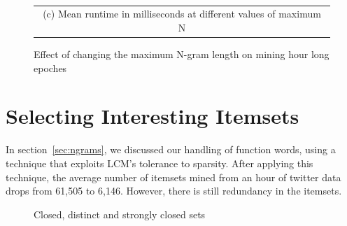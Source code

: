 \documentclass[letterpaper,12pt,titlepage,oneside,final]{book}
\begin{document}
\begin{figure}
{}
\\
\begin{tabular}{c}
\\(c) Mean runtime in milliseconds at different values of maximum N
\end{tabular}
\caption{Effect of changing the maximum N-gram length on mining hour long epoches}
\label{fig:ngramsLen}
\end{figure} 






\chapter{Selecting Interesting Itemsets}
\label{sec:strong}



In section~\ref{sec:ngrams}, we discussed our handling of function words,
using a technique that exploits LCM's tolerance to sparsity.
After applying this technique, the average number of itemsets mined from an
hour of twitter data drops from 61,505 to 6,146.
However, there is still redundancy in the itemsets.


\begin{figure}
\centering
{}
\caption{Closed, distinct and strongly closed sets}
\label{fig:sham}
\end{figure}
\end{document}
